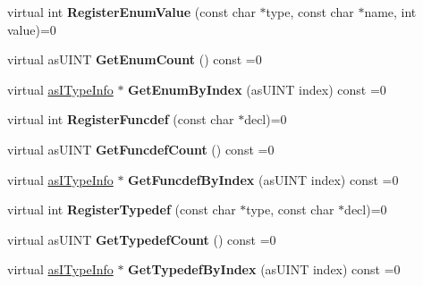 \begin{DoxyCompactItemize}
\item 
\mbox{\label{classas_i_script_engine_a4d331153596dd39838f3bed2a861af18}} 
virtual int {\bfseries Register\+Enum\+Value} (const char $\ast$type, const char $\ast$name, int value)=0
\item 
\mbox{\label{classas_i_script_engine_a4b4307dab64061be43db84ffb97e3782}} 
virtual as\+U\+I\+NT {\bfseries Get\+Enum\+Count} () const =0
\item 
\mbox{\label{classas_i_script_engine_adedc8b2ad11a84ec12aef4f98e27a4c4}} 
virtual \hyperlink{classas_i_type_info}{as\+I\+Type\+Info} $\ast$ {\bfseries Get\+Enum\+By\+Index} (as\+U\+I\+NT index) const =0
\item 
\mbox{\label{classas_i_script_engine_a03c1a2cc23ae4b742c927f3472a1a4f7}} 
virtual int {\bfseries Register\+Funcdef} (const char $\ast$decl)=0
\item 
\mbox{\label{classas_i_script_engine_a48aceb1556f88ce3bec3e0f84abe127f}} 
virtual as\+U\+I\+NT {\bfseries Get\+Funcdef\+Count} () const =0
\item 
\mbox{\label{classas_i_script_engine_ad4228220347347384c0aa0e0dd8308c6}} 
virtual \hyperlink{classas_i_type_info}{as\+I\+Type\+Info} $\ast$ {\bfseries Get\+Funcdef\+By\+Index} (as\+U\+I\+NT index) const =0
\item 
\mbox{\label{classas_i_script_engine_addb24466769dc52be96c7e37d5305245}} 
virtual int {\bfseries Register\+Typedef} (const char $\ast$type, const char $\ast$decl)=0
\item 
\mbox{\label{classas_i_script_engine_a0ebbbb86ea0e314cc2695f6276ebe507}} 
virtual as\+U\+I\+NT {\bfseries Get\+Typedef\+Count} () const =0
\item 
\mbox{\label{classas_i_script_engine_a635cd008ea123b510c66fbddcea735f5}} 
virtual \hyperlink{classas_i_type_info}{as\+I\+Type\+Info} $\ast$ {\bfseries Get\+Typedef\+By\+Index} (as\+U\+I\+NT index) const =0
\item 

\end{DoxyCompactItemize}
